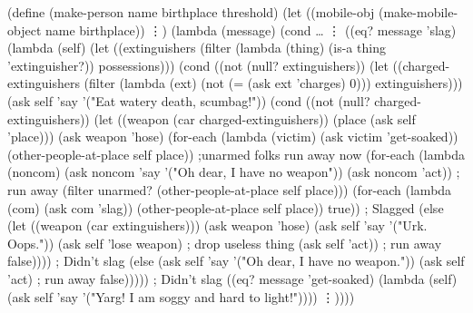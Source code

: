 \beginlisp
(define (make-person name birthplace threshold)
  (let ((mobile-obj (make-mobile-object name birthplace))
        \vdots)
    (lambda (message)
      (cond \ldots
            \vdots
            ((eq? message 'slag)
             (lambda (self)
               (let ((extinguishers (filter (lambda (thing) 
                                              (is-a thing 'extinguisher?))
                                            possessions)))
                 (cond ((not (null? extinguishers)) 
                        (let ((charged-extinguishers
                                (filter (lambda (ext) 
                                          (not (= (ask ext 'charges)
                                                  0)))
                                        extinguishers)))
                          (ask self 'say '("Eat watery death, scumbag!"))
                          (cond ((not (null? charged-extinguishers))
                                 (let ((weapon (car charged-extinguishers))
                                       (place  (ask self 'place)))
                                   (ask weapon 'hose)
                                   (for-each (lambda (victim) (ask victim 'get-soaked))
                                             (other-people-at-place self place))
                                   ;unarmed folks run away now
                                   (for-each (lambda (noncom)
                                               (ask noncom 'say
                                                    '("Oh dear, I have no weapon"))
                                               (ask noncom 'act)) ; run away
                                             (filter unarmed? 
                                                     (other-people-at-place self place)))
                                   (for-each (lambda (com) (ask com 'slag))
                                             (other-people-at-place self place))
                                   true))  ; Slagged
                                (else 
                                 (let ((weapon (car extinguishers)))
                                   (ask weapon 'hose)
                                   (ask self 'say '("Urk.  Oops."))
                                   (ask self 'lose weapon) ; drop useless thing
                                   (ask self 'act))    ; run away
                                 false)))) ; Didn't slag
                       (else (ask self 'say 
                                  '("Oh dear, I have no weapon."))
                             (ask self 'act)  ; run away
                             false)))))    ; Didn't slag
\endlisp
\beginlisp
            ((eq? message 'get-soaked)
             (lambda (self)
               (ask self 'say '("Yarg!  I am soggy and hard to light!"))))
            \vdots))))
\endlisp

